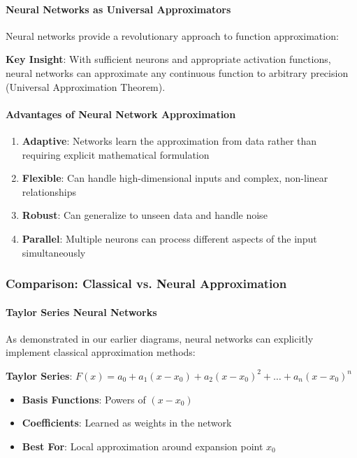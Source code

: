 \paragraph{Neural Networks as Universal Approximators}

Neural networks provide a revolutionary approach to function approximation:

\textbf{Key Insight}: With sufficient neurons and appropriate activation functions, neural networks can approximate any continuous function to arbitrary precision (Universal Approximation Theorem).

\paragraph{Advantages of Neural Network Approximation}

\begin{enumerate}
\item \textbf{Adaptive}: Networks learn the approximation from data rather than requiring explicit mathematical formulation
\item \textbf{Flexible}: Can handle high-dimensional inputs and complex, non-linear relationships
\item \textbf{Robust}: Can generalize to unseen data and handle noise
\item \textbf{Parallel}: Multiple neurons can process different aspects of the input simultaneously
\end{enumerate}

\subsubsection{Comparison: Classical vs. Neural Approximation}

\paragraph{Taylor Series Neural Networks}

As demonstrated in our earlier diagrams, neural networks can explicitly implement classical approximation methods:

\textbf{Taylor Series}: $F(x) = a_0 + a_1(x - x_0) + a_2(x - x_0)^2 + \ldots + a_n(x - x_0)^n$

\begin{itemize}
\item \textbf{Basis Functions}: Powers of $(x - x_0)$
\item \textbf{Coefficients}: Learned as weights in the network
\item \textbf{Best For}: Local approximation around expansion point $x_0$
\end{itemize}

